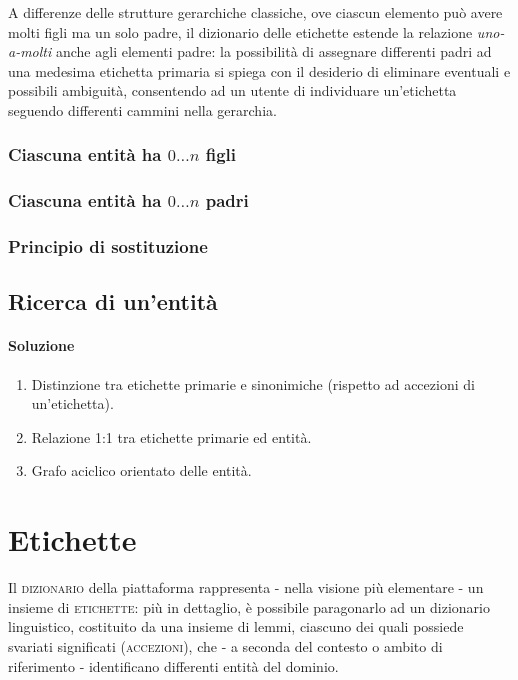\documentclass[10pt,a4paper,headinclude,footinclude,hidelinks]{scrreprt} %
\begin{document}
	A differenze delle strutture gerarchiche classiche, ove ciascun elemento può avere molti figli ma un solo padre, il dizionario delle etichette estende la relazione \textit{uno-a-molti} anche agli elementi padre: la possibilità di assegnare differenti padri ad una medesima etichetta primaria si spiega con il desiderio di eliminare eventuali e possibili ambiguità, consentendo ad un utente di individuare un'etichetta seguendo differenti cammini nella gerarchia.

	\subsubsection{Ciascuna entit\`a ha $0\ldots n$ figli}
	\subsubsection{Ciascuna entit\`a ha $0\ldots n$ padri}
	\subsubsection{Principio di sostituzione}
	\subsection{Ricerca di un'entit\`a}

	\paragraph{Soluzione}
	\begin{enumerate}
	\item Distinzione tra etichette primarie e sinonimiche (rispetto ad accezioni di un'etichetta).
	\item Relazione 1:1 tra etichette primarie ed entità.
	\item Grafo aciclico orientato delle entità.
	\end{enumerate}

	\section{Etichette}
	\label{sec:stage:req:tag}
	
	Il \textsc{dizionario} della piattaforma rappresenta - nella visione più elementare - un insieme di \textsc{etichette}: più in dettaglio, è possibile paragonarlo ad un dizionario linguistico, costituito da una insieme di lemmi, ciascuno dei quali possiede svariati significati (\textsc{accezioni}), che - a seconda del contesto o ambito di riferimento - identificano differenti entità del dominio.
\end{document}
